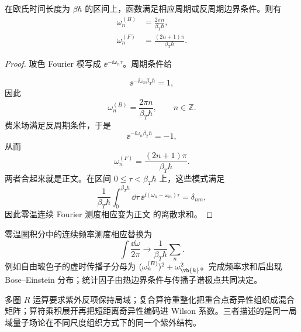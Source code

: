 \begin{proposition}
在欧氏时间长度为 $\beta\hbar$ 的区间上，函数满足相应周期或反周期边界条件。则有
\begin{equation}
 {
 \begin{aligned}
 \omega_n^{(B)}&=\frac{2\pi n}{\beta_T\hbar},\\
 \omega_n^{(F)}&=\frac{(2n+1)\pi}{\beta_T\hbar}.
 \end{aligned}}
\label{eq:matsubara-frequencies-dp11}
\end{equation}
\end{proposition}
\begin{proof}
玻色 Fourier 模写成 $\ee^{-\ii\omega_n\tau}$。周期条件给

\begin{equation*}
 \ee^{-\ii\omega_n\beta_T\hbar}=1,
\end{equation*}
因此
\begin{equation*}
 \omega_n^{(B)}=\frac{2\pi n}{\beta_T\hbar},
 \qquad n\in\mathbb Z.
\end{equation*}
费米场满足反周期条件，于是
\begin{equation*}
 \ee^{-\ii\omega_n\beta_T\hbar}=-1,
\end{equation*}
从而
\begin{equation*}
 \omega_n^{(F)}=\frac{(2n+1)\pi}{\beta_T\hbar}.
\end{equation*}
两者合起来就是正文。在区间 $0\le\tau<\beta_T\hbar$ 上，这些模式满足
\begin{equation*}
 \frac1{\beta_T\hbar}\int_0^{\beta_T\hbar}\dd\tau\,
 \ee^{\ii(\omega_n-\omega_m)\tau}=\delta_{nm},
\end{equation*}
因此零温连续 Fourier 测度相应变为正文 的离散求和。
\end{proof}

零温圈积分中的连续频率测度相应替换为
\begin{equation}
 {
 \int\frac{\dd\omega}{2\pi}
 \longrightarrow
 \frac1{\beta_T\hbar}\sum_n.}
 \label{eq:matsubara-loop-replacement-dp11}
\end{equation}
例如自由玻色子的虚时传播子分母为 $(\omega_n^{(B)})^2+\omega_{\vb{k}}^2$。完成频率求和后出现 Bose--Einstein 分布；统计因子由热边界条件与传播子谱极点共同决定。



多圈 $R$ 运算要求紫外反项保持局域；复合算符重整化把重合点奇异性组织成混合矩阵；算符乘积展开再把短距离奇异性编码进 Wilson 系数。三者描述的是同一局域量子场论在不同尺度组织方式下的同一个紫外结构。

